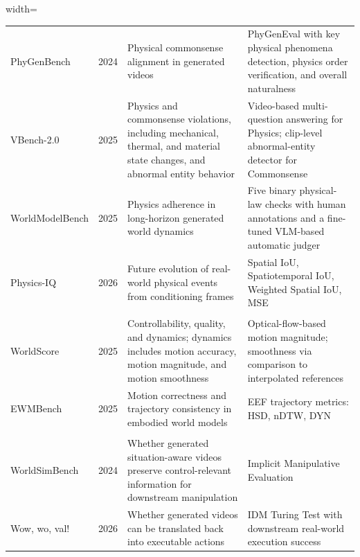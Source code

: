 \begin{table}[!h]
\begin{adjustbox}{width=\textwidth}
\begin{threeparttable}
\begin{tabular}{
>{\RaggedRight\arraybackslash}p{2.6cm}
c
>{\RaggedRight\arraybackslash}p{5.2cm}
>{\RaggedRight\arraybackslash}p{4.4cm}
}
PhyGenBench \cite{meng2024phygenbench} & 2024 & Physical commonsense alignment in generated videos & PhyGenEval with key physical phenomena detection, physics order verification, and overall naturalness \\

VBench-2.0 \cite{zheng2025vbench} & 2025 & Physics and commonsense violations, including mechanical, thermal, and material state changes, and abnormal entity behavior & Video-based multi-question answering for Physics; clip-level abnormal-entity detector for Commonsense \\

WorldModelBench \cite{li2025worldmodelbench} & 2025 & Physics adherence in long-horizon generated world dynamics & Five binary physical-law checks with human annotations and a fine-tuned VLM-based automatic judger \\

Physics-IQ \cite{motamed2026physicsiq} & 2026 & Future evolution of real-world physical events from conditioning frames & Spatial IoU, Spatiotemporal IoU, Weighted Spatial IoU, MSE \\

\midrule

\rowcolor{gray!12}
\multicolumn{4}{l}{\textbf{Motion and Trajectory Plausibility}} \\
WorldScore \cite{duan2025worldscoreunifiedevaluationbenchmark} & 2025 & Controllability, quality, and dynamics; dynamics includes motion accuracy, motion magnitude, and motion smoothness & Optical-flow-based motion magnitude; smoothness via comparison to interpolated references \\

EWMBench \cite{yue2025ewmbench} & 2025 & Motion correctness and trajectory consistency in embodied world models & EEF trajectory metrics: HSD, nDTW, DYN \\

\midrule

\rowcolor{gray!12}
\multicolumn{4}{l}{\textbf{Action Plausibility}} \\
WorldSimBench \cite{qin2024worldsimbenchvideogenerationmodels} & 2024 & Whether generated situation-aware videos preserve control-relevant information for downstream manipulation & Implicit Manipulative Evaluation \\

Wow, wo, val! \cite{fan2026wow} & 2026 & Whether generated videos can be translated back into executable actions & IDM Turing Test with downstream real-world execution success \\

\bottomrule
\end{tabular}
\end{threeparttable}
\end{adjustbox}
\end{table}

